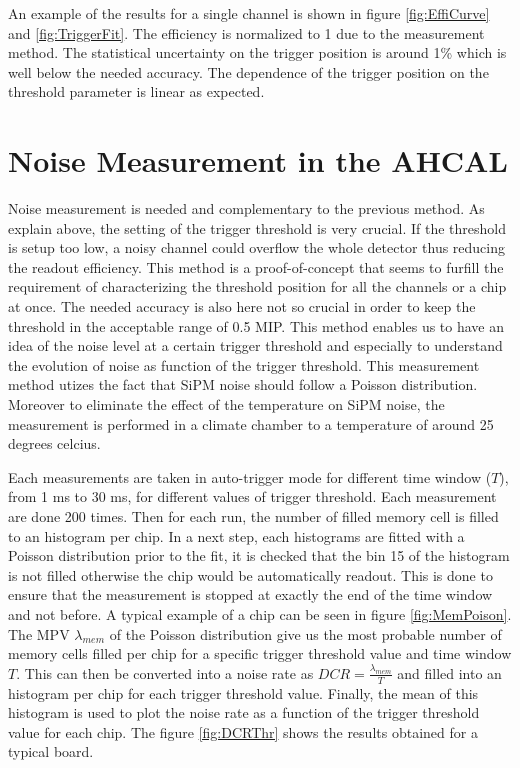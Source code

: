 An example of the results for a single channel is shown in figure \ref{fig:EffiCurve} and \ref{fig:TriggerFit}. The efficiency is normalized to 1 due to the measurement method. The statistical uncertainty on the trigger position is around 1\% which is well below the needed accuracy. The dependence of the trigger position on the threshold parameter is linear as expected.

\section{Noise Measurement in the AHCAL}

Noise measurement is needed and complementary to the previous method. As explain above, the setting of the trigger threshold is very crucial. If the threshold is setup too low, a noisy channel could overflow the whole detector thus reducing the readout efficiency. This method is a proof-of-concept that seems to furfill the requirement of characterizing the threshold position for all the channels or a chip at once. The needed accuracy is also here not so crucial in order to keep the threshold in the acceptable range of 0.5 MIP. This method enables us to have an idea of the noise level at a certain trigger threshold and especially to understand the evolution of noise as function of the trigger threshold. This measurement method utizes the fact that SiPM noise should follow a Poisson distribution. Moreover to eliminate the effect of the temperature on SiPM noise, the measurement is performed in a climate chamber to a temperature of around 25 degrees celcius.

Each measurements are taken in auto-trigger mode for different time window ($T$), from 1 ms to 30 ms, for different values of trigger threshold. Each measurement are done 200 times. Then for each run, the number of filled memory cell is filled to an histogram per chip. In a next step, each histograms are fitted with a Poisson distribution prior to the fit, it is checked that the bin 15 of the histogram is not filled otherwise the chip would be automatically readout. This is done to ensure that the measurement is stopped at exactly the end of the time window and not before. A typical example of a chip can be seen in figure \ref{fig:MemPoison}. The MPV $\lambda_{mem}$ of the Poisson distribution give us the most probable number of memory cells filled per chip for a specific trigger threshold value and time window $T$. This can then be converted into a noise rate as $DCR = \frac{\lambda_{mem}}{T}$ and filled into an histogram per chip for each trigger threshold value. Finally, the mean of this histogram is used to plot the noise rate as a function of the trigger threshold value for each chip. The figure \ref{fig:DCRThr} shows the results obtained for a typical board.

